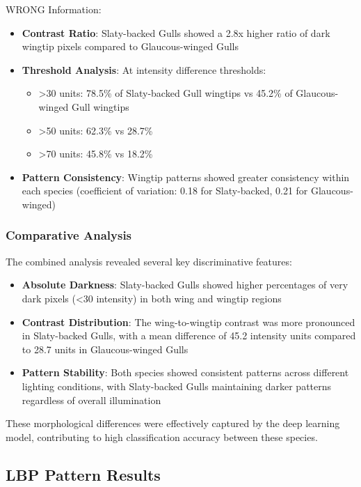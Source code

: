 \documentclass[a4paper,12pt]{report}
\begin{document}
WRONG Information:

\begin{itemize}
    \item \textbf{Contrast Ratio}: Slaty-backed Gulls showed a 2.8x higher ratio of dark wingtip pixels compared to Glaucous-winged Gulls
    \item \textbf{Threshold Analysis}: At intensity difference thresholds:
        \begin{itemize}
            \item >30 units: 78.5\% of Slaty-backed Gull wingtips vs 45.2\% of Glaucous-winged Gull wingtips
            \item >50 units: 62.3\% vs 28.7\%
            \item >70 units: 45.8\% vs 18.2\%
        \end{itemize}
    \item \textbf{Pattern Consistency}: Wingtip patterns showed greater consistency within each species (coefficient of variation: 0.18 for Slaty-backed, 0.21 for Glaucous-winged)
\end{itemize}

\subsubsection{Comparative Analysis}
The combined analysis revealed several key discriminative features:
\begin{itemize}
    \item \textbf{Absolute Darkness}: Slaty-backed Gulls showed higher percentages of very dark pixels (<30 intensity) in both wing and wingtip regions
    \item \textbf{Contrast Distribution}: The wing-to-wingtip contrast was more pronounced in Slaty-backed Gulls, with a mean difference of 45.2 intensity units compared to 28.7 units in Glaucous-winged Gulls
    \item \textbf{Pattern Stability}: Both species showed consistent patterns across different lighting conditions, with Slaty-backed Gulls maintaining darker patterns regardless of overall illumination
\end{itemize}

These morphological differences were effectively captured by the deep learning model, contributing to high classification accuracy between these species.


\subsection{LBP Pattern Results}
\end{document}

